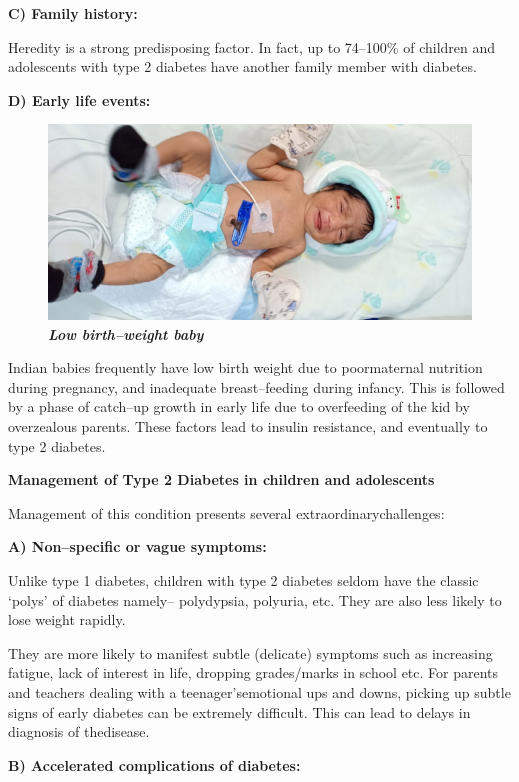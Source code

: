 \noindent\textbf{C) Family history:}

Heredity is a strong predisposing factor. In fact, up to 74–100\% of children and adolescents with type 2 diabetes have another family member with diabetes.

\noindent\textbf{D) Early life events:}

\begin{figure}[h]
\centering
\includegraphics[scale=1.3]{images/025.jpg}\\
\small\textbf{\textit{Low birth–weight baby}}
\end{figure}

Indian babies frequently have low birth weight due to poor\break maternal nutrition during pregnancy, and inadequate breast–feeding during infancy. This is followed by a phase of catch–up growth in early life due to overfeeding of the kid by overzealous parents. These factors lead to insulin resi\-stance, and eventually to type 2 diabetes.

\noindent\textbf{Management of Type 2 Diabetes in children and adolescents}

Management of this condition presents several extraordinary\break challenges:

\noindent\textbf{A) Non–specific or vague symptoms:}

Unlike type 1 diabetes, children with type 2 diabetes seldom have the classic ‘polys’ of diabetes namely– polydypsia, polyuria, etc. They are also less likely to lose weight rapidly.

They are more likely to manifest subtle (delicate) symptoms such as increasing fatigue, lack of interest in life, dropping grades/marks in school etc. For parents and teachers dealing with a teenager’s\break emotional ups and downs, picking up subtle signs of early diabetes can be extremely difficult. This can lead to delays in diagnosis of the\break disease.

\noindent\textbf{B) Accelerated complications of diabetes:}

